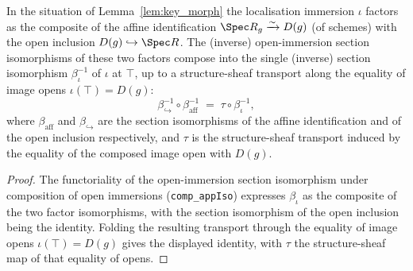 \begin{lemma}
  \label{lem:tile_appIso_comp}
  In the situation of Lemma~\ref{lem:key_morph} the localisation immersion \(\iota\) factors as the
  composite of the affine identification \(\Spec R_g \xrightarrow{\sim} D(g)\) (of schemes) with the open
  inclusion \(D(g) \hookrightarrow \Spec R\). The (inverse) open-immersion section isomorphisms of these
  two factors compose into the single (inverse) section isomorphism \(\beta_\iota^{-1}\) of \(\iota\) at
  \(\top\), up to a structure-sheaf transport along the equality of image opens
  \(\iota(\top) = D(g)\):
  \[
    \beta_{\hookrightarrow}^{-1} \circ \beta_{\mathrm{aff}}^{-1}
    \;=\;
    \tau \circ \beta_\iota^{-1},
  \]
  where \(\beta_{\mathrm{aff}}\) and \(\beta_{\hookrightarrow}\) are the section isomorphisms of the
  affine identification and of the open inclusion respectively, and \(\tau\) is the structure-sheaf
  transport induced by the equality of the composed image open with \(D(g)\).
\end{lemma}
\begin{proof}

\leanok
  The functoriality of the open-immersion section isomorphism under composition of open immersions
  (\texttt{comp\_appIso}) expresses \(\beta_\iota\) as the composite of the two factor isomorphisms, with
  the section isomorphism of the open inclusion being the identity. Folding the resulting transport
  through the equality of image opens \(\iota(\top) = D(g)\) gives the displayed identity, with \(\tau\)
  the structure-sheaf map of that equality of opens.
\end{proof}

